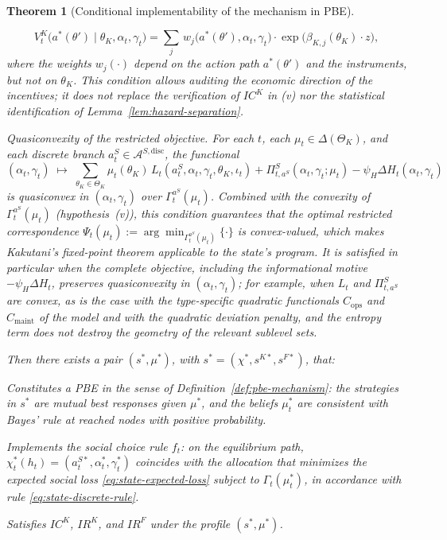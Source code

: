 \documentclass[review,authoryear,12pt]{elsarticle}
\theoremstyle{plain}
\newtheorem{theorem}{Theorem}
\theoremstyle{definition}
\newcommand{\ThetaK}{\Theta_K}
\newcommand{\1}{\mathbf{1}}
\begin{document}
\begin{theorem}[Conditional implementability of the mechanism in PBE]
\begin{list}{}
  \[
    V^K_t\!\bigl(a^\ast(\theta')\mid\theta_K,\alpha_t,\gamma_t\bigr)
    =
    \sum_{j}\,w_j\!\bigl(a^\ast(\theta'),\alpha_t,\gamma_t\bigr)
    \cdot\exp\!\bigl(\beta_{K,j}(\theta_K)\cdot z\bigr),
  \]
  where the weights $w_j(\cdot)$ depend on the action path $a^\ast(\theta')$ and the instruments, but not on $\theta_K$. This condition allows auditing the economic direction of the incentives; it does not replace the verification of $IC^K$ in \textup{(v)} nor the statistical identification of Lemma~\ref{lem:hazard-separation}.
  \item[\textup{(vii)}] Quasiconvexity of the restricted objective. For each $t$, each $\mu_t\in\Delta(\ThetaK)$, and each discrete branch $a_t^S\in\mathcal{A}^{S,\mathrm{disc}}$, the functional
  \[
  (\alpha_t,\gamma_t)\;\mapsto\;\sum_{\theta_K\in\ThetaK}\mu_t(\theta_K)\,L_t(a_t^S,\alpha_t,\gamma_t,\theta_K,\iota_t)
  +\Pi_{t,a^S}^S(\alpha_t,\gamma_t;\mu_t)
  -\psi_H\Delta H_t(\alpha_t,\gamma_t)
  \]
  is quasiconvex in $(\alpha_t,\gamma_t)$ over $\Gamma_t^{a^S}(\mu_t)$. Combined with the convexity of $\Gamma_t^{a^S}(\mu_t)$ \textup{(}hypothesis~\textup{(v)}\textup{)}, this condition guarantees that the optimal restricted correspondence $\Psi_t(\mu_t):=\arg\min_{\Gamma_t^{a^S}(\mu_t)}\{\cdot\}$ is convex-valued, which makes Kakutani's fixed-point theorem applicable to the state's program. It is satisfied in particular when the complete objective, including the informational motive $-\psi_H\Delta H_t$, preserves quasiconvexity in $(\alpha_t,\gamma_t)$; for example, when $L_t$ and $\Pi_{t,a^S}^S$ are convex, as is the case with the type-specific quadratic functionals $C_{\mathrm{ops}}$ and $C_{\mathrm{maint}}$ of the model and with the quadratic deviation penalty, and the entropy term does not destroy the geometry of the relevant sublevel sets.
\end{list}

Then there exists a pair $(s^\ast,\mu^\ast)$, with $s^\ast=({\chi}^\ast,s^{K\ast},s^{F\ast})$, that:
\begin{list}{}{\setlength{\labelwidth}{2.0em}\setlength{\labelsep}{0.7em}\setlength{\leftmargin}{2.7em}\setlength{\itemindent}{0pt}\setlength{\listparindent}{0pt}\setlength{\parsep}{0pt}\setlength{\itemsep}{0.25\baselineskip}}
    \item[\textup{(a)}] Constitutes a PBE in the sense of Definition~\ref{def:pbe-mechanism}: the strategies in $s^\ast$ are mutual best responses given $\mu^\ast$, and the beliefs $\mu_t^\ast$ are consistent with Bayes' rule at reached nodes with positive probability.
    \item[\textup{(b)}] Implements the social choice rule $f_t$: on the equilibrium path, $\chi_t^\ast(h_t)=(a_t^{S\ast},\alpha_t^\ast,\gamma_t^\ast)$ coincides with the allocation that minimizes the expected social loss \eqref{eq:state-expected-loss} subject to $\Gamma_t(\mu_t^\ast)$, in accordance with rule \eqref{eq:state-discrete-rule}.
    \item[\textup{(c)}] Satisfies $IC^K$, $IR^K$, and $IR^F$ under the profile $(s^\ast,\mu^\ast)$.
\end{list}
\end{theorem}
\end{document}
